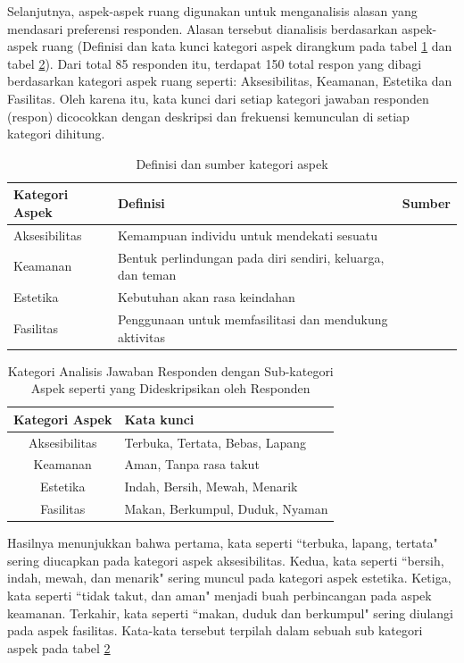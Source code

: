 \documentclass[11pt]{udthesis} %
\begin{document}
Selanjutnya, aspek-aspek ruang digunakan untuk menganalisis alasan yang mendasari preferensi responden.
Alasan tersebut dianalisis berdasarkan aspek-aspek ruang (Definisi dan kata kunci kategori aspek dirangkum pada tabel \ref{tab:defasp} dan tabel \ref{tab:katasp}). Dari total 85 responden itu, terdapat 150 total respon yang dibagi berdasarkan kategori aspek ruang seperti: Aksesibilitas, Keamanan, Estetika dan Fasilitas. Oleh karena itu, kata kunci dari setiap kategori jawaban responden (respon) dicocokkan dengan deskripsi dan frekuensi kemunculan di setiap kategori dihitung.

\begin{table}[htpb]
    \centering
    \caption{Definisi dan sumber kategori aspek}
    \label{tab:defasp}
    \begin{tabularx}{\textwidth}{p{2.2cm} p{} l}
        \toprule
        \textbf{Kategori Aspek} & \textbf{Definisi} & \textbf{Sumber}\\
\midrule
Aksesibilitas & Kemampuan individu untuk mendekati sesuatu  & \cite{larosa2018} \\
Keamanan & Bentuk perlindungan pada diri sendiri, keluarga, dan teman & \cite{carr1992} \\
Estetika & Kebutuhan akan rasa keindahan & \cite{hradilova2013} \\
Fasilitas & Penggunaan untuk memfasilitasi dan mendukung aktivitas  & \cite{carmona2021} \\
\bottomrule
    \end{tabularx}
\end{table}

\begin{table}[ht]
    \centering
    \caption{Kategori Analisis Jawaban Responden dengan Sub-kategori Aspek seperti yang Dideskripsikan oleh Responden}
    \label{tab:katasp}
    \begin{tabular}{c l}
        \toprule
        \textbf{Kategori Aspek} & \textbf{Kata kunci}\\
\midrule
Aksesibilitas & Terbuka, Tertata, Bebas, Lapang \\
Keamanan & Aman, Tanpa rasa takut\\
Estetika & Indah, Bersih, Mewah, Menarik \\
Fasilitas & Makan, Berkumpul, Duduk, Nyaman \\
\bottomrule
    \end{tabular}
\end{table}

Hasilnya menunjukkan bahwa pertama, kata seperti ``terbuka, lapang, tertata" sering diucapkan pada kategori aspek aksesibilitas. Kedua, kata seperti ``bersih, indah, mewah, dan menarik" sering muncul pada kategori aspek estetika. Ketiga, kata seperti ``tidak takut, dan aman" menjadi buah perbincangan pada aspek keamanan. Terkahir, kata seperti ``makan, duduk dan berkumpul" sering diulangi pada aspek fasilitas. Kata-kata tersebut terpilah dalam sebuah sub kategori aspek pada tabel \ref{tab:katasp}
\end{document}
